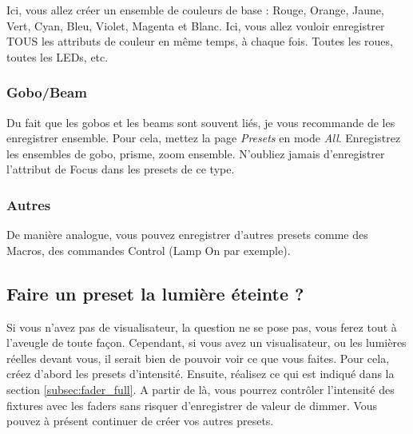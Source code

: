 Ici, vous allez créer un ensemble de couleurs de base : Rouge, Orange, Jaune, Vert, Cyan, Bleu, Violet, Magenta et Blanc.
\newline
Ici, vous allez vouloir enregistrer TOUS les attributs de couleur en même temps, à chaque fois. Toutes les roues, toutes les LEDs, etc.

\subsubsection{Gobo/Beam}
\label{subsubsec:presets_gobo_beam}

Du fait que les gobos et les beams sont souvent liés, je vous recommande de les enregistrer ensemble.
\newline
\newline
Pour cela, mettez la page \textit{Presets} en mode \textit{All}.
Enregistrez les ensembles de gobo, prisme, zoom ensemble. N'oubliez jamais d'enregistrer l'attribut de Focus dans les presets de ce type.

\subsubsection{Autres}
\label{subsubsec:presets_autres}

De manière analogue, vous pouvez enregistrer d'autres presets comme des Macros, des commandes Control (Lamp On par exemple).

\subsection{Faire un preset la lumière éteinte ?}
\label{subsec:presets_lumiere_eteinte}

Si vous n'avez pas de visualisateur, la question ne se pose pas, vous ferez tout à l'aveugle de toute façon.
\newline
Cependant, si vous avez un visualisateur, ou les lumières réelles devant vous, il serait bien de pouvoir voir ce que vous faites.
Pour cela, créez d'abord les presets d'intensité. Ensuite, réalisez ce qui est indiqué dans la section \ref{subsec:fader_full}.
A partir de là, vous pourrez contrôler l'intensité des fixtures avec les faders sans risquer d'enregistrer de valeur de dimmer.
Vous pouvez à présent continuer de créer vos autres presets.